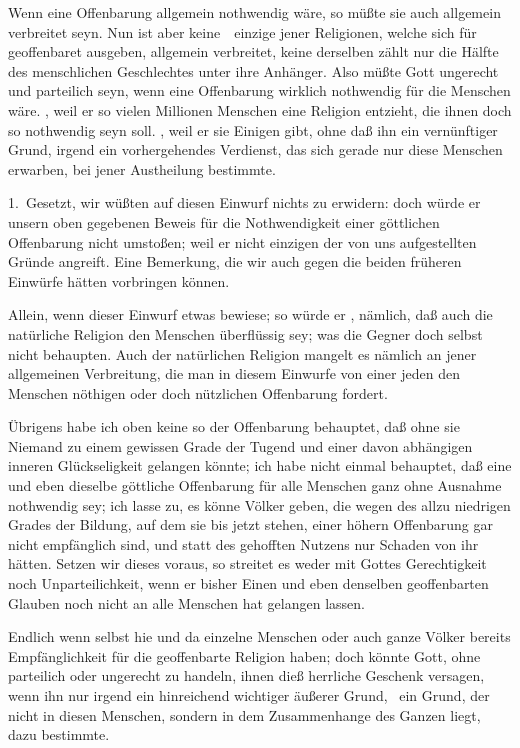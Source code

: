 Wenn eine Offenbarung allgemein nothwendig wäre, so müßte sie auch allgemein verbreitet seyn. Nun ist aber keine~\ einzige jener Religionen, welche sich für geoffenbaret ausgeben, allgemein verbreitet, keine derselben zählt  nur die Hälfte des menschlichen Geschlechtes unter ihre Anhänger. Also müßte Gott ungerecht und parteilich seyn, wenn eine Offenbarung wirklich nothwendig für die Menschen wäre. , weil er so vielen Millionen Menschen eine Religion entzieht, die ihnen doch so nothwendig seyn soll. , weil er sie Einigen gibt, ohne daß ihn ein vernünftiger Grund, irgend ein vorhergehendes Verdienst, das sich gerade nur diese Menschen erwarben, bei jener Austheilung bestimmte.\par
{} 1.~Gesetzt, wir wüßten auf diesen Einwurf nichts zu erwidern: doch würde er unsern oben gegebenen Beweis für die Nothwendigkeit einer göttlichen Offenbarung nicht umstoßen; weil er nicht  einzigen der von uns aufgestellten Gründe angreift. Eine Bemerkung, die wir auch gegen die beiden früheren Einwürfe hätten vorbringen können.
\begin{aufza}\setcounter{enumi}{1}
\item Allein, wenn dieser Einwurf etwas bewiese; so würde er , nämlich, daß auch die natürliche Religion den Menschen überflüssig sey; was die Gegner doch selbst nicht behaupten. Auch der natürlichen Religion mangelt es nämlich an jener allgemeinen Verbreitung, die man in diesem Einwurfe von einer jeden den Menschen nöthigen oder doch nützlichen Offenbarung fordert.
\item Übrigens habe ich oben keine so  der Offenbarung behauptet, daß ohne sie Niemand zu einem gewissen Grade der Tugend und einer davon abhängigen inneren Glückseligkeit gelangen könnte; ich habe nicht einmal behauptet, daß eine und eben dieselbe göttliche Offenbarung für alle Menschen ganz ohne Ausnahme nothwendig sey; ich lasse zu, es könne Völker geben, die wegen des allzu niedrigen Grades der Bildung, auf dem sie bis jetzt stehen, einer höhern Offenbarung gar nicht empfänglich sind, und statt des gehofften Nutzens nur Schaden von ihr hätten. Setzen wir dieses voraus, so streitet es weder mit Gottes Gerechtigkeit noch Unparteilichkeit, wenn er bisher Einen und eben denselben geoffenbarten Glauben noch nicht an alle Menschen hat gelangen lassen.
\item Endlich wenn selbst hie und da einzelne Menschen oder auch ganze Völker bereits Empfänglichkeit für die geoffenbarte Religion haben; doch könnte Gott, ohne parteilich oder ungerecht zu handeln, ihnen dieß herrliche Geschenk versagen, wenn ihn nur irgend ein hinreichend wichtiger äußerer Grund, \dh\ ein Grund, der nicht in diesen Menschen, sondern in dem Zusammenhange des Ganzen liegt, dazu bestimmte.
\end{aufza}

